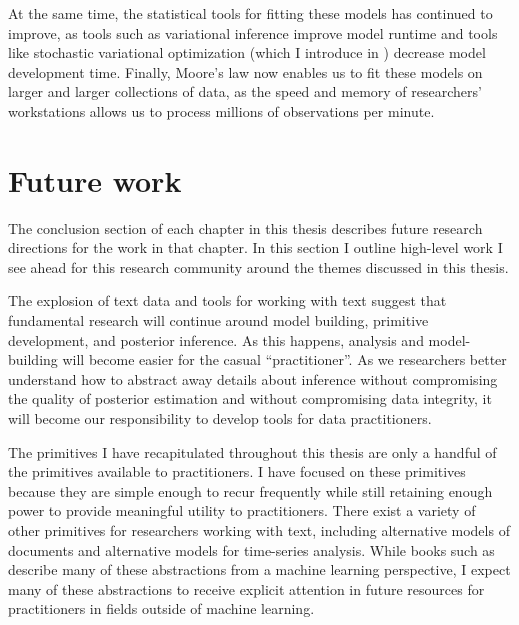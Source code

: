 At the same time, the statistical tools for fitting these models has
continued to improve, as tools such as variational inference improve
model runtime and tools like stochastic variational optimization
(which I introduce in )
decrease model development time. Finally, Moore's law now
enables us to fit these models on larger and larger collections of
data, as the speed and memory of researchers' workstations allows us
to process millions of observations per minute.

\section{Future work}
The conclusion section of each chapter in this thesis describes future
research directions for the work in that chapter.  In this section I
outline high-level work I see ahead for this research community
around the themes discussed in this thesis.

The explosion of text data and tools for working with text suggest
that fundamental research will continue around model building,
primitive development, and posterior inference.  As this happens,
analysis and model-building will become easier for the casual
``practitioner''.  As we researchers better understand how to abstract
away details about inference without compromising the quality of
posterior estimation and without compromising data integrity, it will
become our responsibility to develop tools for data practitioners.

The primitives I have recapitulated throughout this thesis are only a
handful of the primitives available to practitioners.  I have focused
on these primitives because they are simple enough to recur frequently
while still retaining enough power to provide meaningful utility to
practitioners.  There exist a variety of other primitives for
researchers working with text, including alternative
models of documents and alternative models for time-series analysis.
While books such as \cite{bishop:2006} describe many of these
abstractions from a machine learning perspective, I expect many of these
abstractions to receive explicit attention in future resources for
practitioners in fields outside of machine learning.


